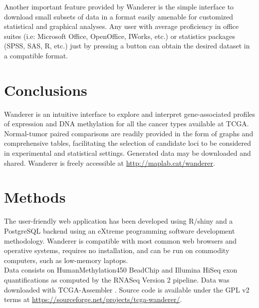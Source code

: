 \documentclass{bmcart}
\begin{document}
Another important feature provided by Wanderer is the simple interface to download small subsets of data in a format easily amenable for customized statistical and graphical analyses. Any user with average proficiency in office suites (i.e: Microsoft Office, OpenOffice, IWorks, etc.) or statistics packages (SPSS, SAS, R, etc.) just by pressing a button can obtain the desired dataset in a compatible format.\\

\section*{Conclusions}

Wanderer is an intuitive interface to explore and interpret gene-associated profiles of expression and DNA methylation for all the cancer types available at TCGA. Normal-tumor paired comparisons are readily provided in the form of graphs and comprehensive tables, facilitating the selection of candidate loci to be considered in experimental and statistical settings. Generated data may be downloaded and shared. Wanderer is freely accessible at \url{http://maplab.cat/wanderer}.\\



\section*{Methods}
The user-friendly web application has been developed using R/shiny and a PostgreSQL backend using an eXtreme programming software development methodology. Wanderer is compatible with most common web browsers and operative systems, requires no installation, and can be run on commodity computers, such as low-memory laptops.\\
 
Data consists on HumanMethylation450 BeadChip and Illumina HiSeq exon quantifications as computed by the RNASeq Version 2 pipeline. Data was downloaded with TCGA-Assembler \cite{zhu2014tcga}. Source code is available under the GPL v2 terms at \url{https://sourceforge.net/projects/tcga-wanderer/}.







\end{document}
